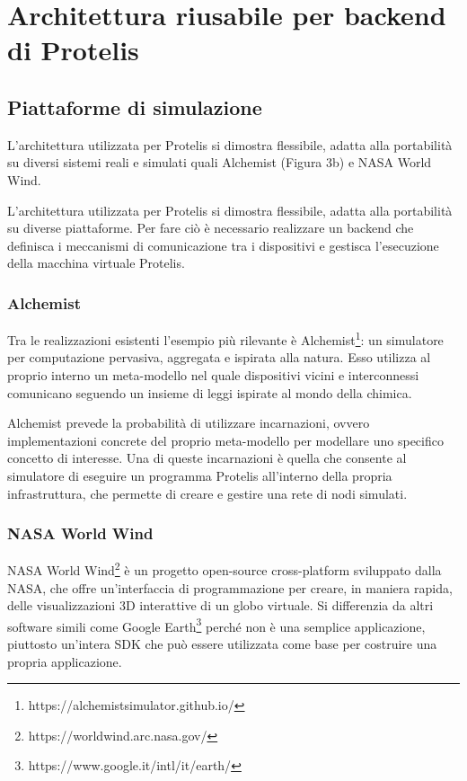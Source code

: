 \chapter{Architettura riusabile per backend di Protelis}
\section{Piattaforme di simulazione}
L'architettura utilizzata per Protelis si dimostra flessibile, adatta alla
portabilità su diversi sistemi reali\cite{Clark2015} e simulati quali
Alchemist\cite{alchemist} (Figura 3b) e NASA World Wind\cite{Bell2007}.

L'architettura utilizzata per Protelis si dimostra flessibile, adatta alla
portabilità su diverse piattaforme. Per fare ciò è necessario realizzare un
backend che definisca i meccanismi di comunicazione tra i dispositivi e
gestisca l'esecuzione della macchina virtuale Protelis.

\subsection{Alchemist}
Tra le realizzazioni esistenti l'esempio più rilevante è
Alchemist\footnote{https://alchemistsimulator.github.io/}: un simulatore per
computazione pervasiva, aggregata e ispirata alla natura. Esso utilizza al
proprio interno un meta-modello nel quale dispositivi vicini e interconnessi
comunicano seguendo un insieme di leggi ispirate al mondo della chimica.

Alchemist prevede la probabilità di utilizzare incarnazioni, ovvero
implementazioni concrete del proprio meta-modello per modellare uno specifico
concetto di interesse. Una di queste incarnazioni è quella che consente al
simulatore di eseguire un programma Protelis all'interno della propria
infrastruttura, che permette di creare e gestire una rete di nodi simulati.


\subsection{NASA World Wind}
NASA World Wind\footnote{https://worldwind.arc.nasa.gov/} è un progetto
open-source cross-platform sviluppato dalla NASA, che offre un'interfaccia di
programmazione per creare, in maniera rapida, delle visualizzazioni 3D
interattive di un globo virtuale. Si differenzia da altri software simili come
Google Earth\footnote{https://www.google.it/intl/it/earth/} perché non è una
semplice applicazione, piuttosto un'intera SDK che può essere utilizzata come
base per costruire una propria applicazione.

